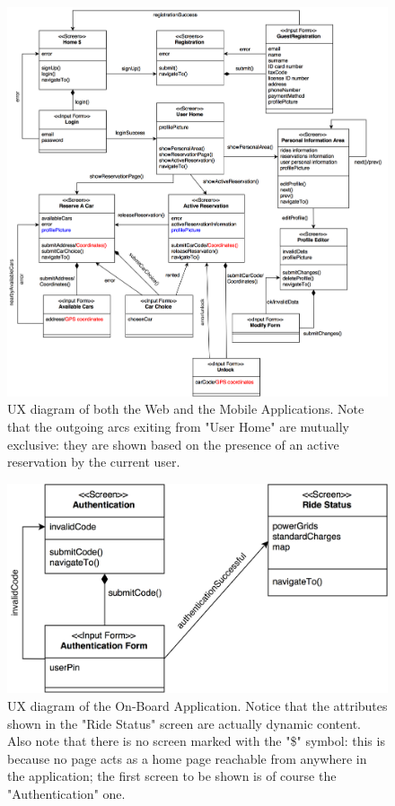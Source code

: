 \begin{figure}[H]
\begin{center}
		\includegraphics[width=\textwidth]{./user_interface_design/diagrams/web_mobile_ux.png}
		\caption{UX diagram of both the Web and the Mobile Applications. Note that the outgoing arcs exiting from "User Home" are mutually exclusive: they are shown based on the presence of an active reservation by the current user.}
		\label{web_mobile_ux}
\end{center}
\end{figure}

\begin{figure}[H]
\begin{center}
		\includegraphics[width=\textwidth]{./user_interface_design/diagrams/on_board_ux.png}
		\caption{UX diagram of the On-Board Application. Notice that the attributes shown in the "Ride Status" screen are actually dynamic content. Also note that there is no screen marked with the "\$" symbol: this is because no page acts as a home page reachable from anywhere in the application; the first screen to be shown is of course the "Authentication" one.}
		\label{on_board_ux}
\end{center}
\end{figure}